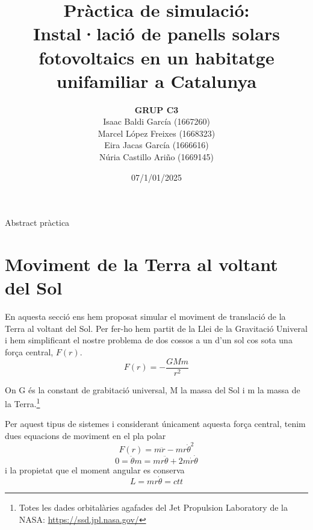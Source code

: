 \documentclass[11pt]{article}
\title{\Huge\bfseries Pràctica de simulació: \\ Instal·lació de panells solars fotovoltaics en un habitatge unifamiliar a Catalunya \\ [2ex] \Large}
\author{\begin{tabular}{c}
\textbf{GRUP C3} \\
Isaac Baldi García (1667260)\\
Marcel López Freixes (1668323) \\
Eira Jacas García (1666616) \\
Núria Castillo Ariño (1669145)
\end{tabular}}
\date{07/1/01/2025}
\begin{document}
\maketitle

Abstract pràctica 

\section{Moviment de la Terra al voltant del Sol} \label{sec: seccio_1}
En aquesta secció ens hem proposat simular el moviment de translació de la Terra al voltant del Sol. Per fer-ho hem partit de la Llei de la Gravitació Univeral i hem simplificant el nostre problema de dos cossos a un d'un sol cos sota una força central, $F(r)$.
\begin{equation}
    F(r)=-\frac{GMm}{r^2}
\end{equation}

On G és la constant de grabitació universal, M la massa del Sol i m la massa de la Terra.\footnote{Totes les dades orbitalàries agafades del Jet Propulsion Laboratory de la NASA: \url{https://ssd.jpl.nasa.gov/}}

Per aquest tipus de sistemes i considerant únicament aquesta força central, tenim dues equacions de moviment en el pla polar 
\begin{equation}
    F(r)=m\ddot{r}-mr{\dot{\theta}}^2
    \label{equ_en_r}
\end{equation}
\begin{equation}
    0=\ddot{\theta}m=mr\ddot{\theta}+2m\dot{r}\dot{\theta}
    \label{equ_en_theta}
\end{equation}
i la propietat que el moment angular es conserva
\begin{equation}
    L=mr\dot{\theta}=ctt
    \label{moment_angular}
\end{equation}
\end{document}
